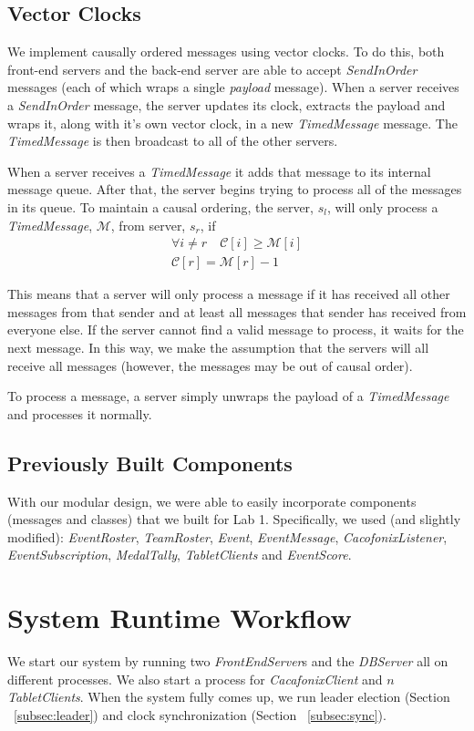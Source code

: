 \documentclass[11pt]{article}
\begin{document}
\subsection{Vector Clocks}
\label{subsec:vector}
We implement causally ordered messages using vector clocks.  To do
this, both front-end servers and the back-end server are able to
accept \emph{SendInOrder} messages (each of which wraps a single
\emph{payload} message).  When a server receives a \emph{SendInOrder}
message, the server updates its clock, extracts the payload and wraps
it, along with it's own vector clock, in a new \emph{TimedMessage}
message.  The \emph{TimedMessage} is then broadcast to all of the
other servers.

When a server receives a \emph{TimedMessage} it adds that message to
its internal message queue. After that, the server begins trying to
process all of the messages in its queue.  To maintain a causal
ordering, the server, $s_l$, will only process a \emph{TimedMessage},
$\mathcal{M}$, from server, $s_r$, if
\begin{align*}
 \forall i \ne r \quad \mathcal{C}[i] \ge \mathcal{M}[i] \\
 \mathcal{C}[r] = \mathcal{M}[r] - 1
\end{align*}

This means that a server will only process a message if it has
received all other messages from that sender and at least all messages
that sender has received from everyone else.  If the server cannot
find a valid message to process, it waits for the next message. In
this way, we make the assumption that the servers will all receive all
messages (however, the messages may be out of causal order).

To process a message, a server simply unwraps the payload of a
\emph{TimedMessage} and processes it normally.

\subsection{Previously Built Components}
With our modular design, we were able to easily incorporate components
(messages and classes) that we built for Lab 1.  Specifically, we used
(and slightly modified): \emph{EventRoster}, \emph{TeamRoster},
\emph{Event}, \emph{EventMessage}, \emph{CacofonixListener},
\emph{EventSubscription}, \emph{MedalTally}, \emph{TabletClients}
and \emph{EventScore}.

\section{System Runtime Workflow}
We start our system by running two \emph{FrontEndServer}s and the
\emph{DBServer} all on different processes.  We also start a process
for \emph{CacafonixClient} and $n$ \emph{TabletClients}.  When the system
fully comes up, we run leader election (Section ~\ref{subsec:leader})
and clock synchronization (Section ~\ref{subsec:sync}).
\end{document}
